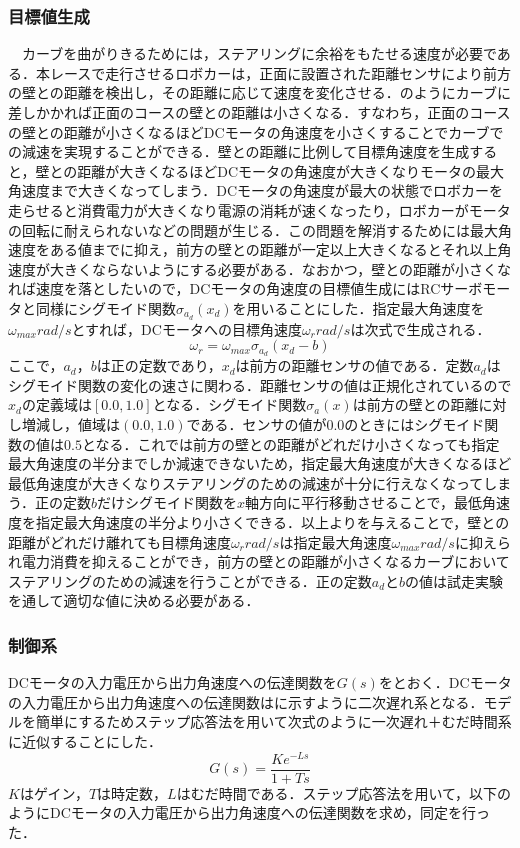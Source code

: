 \subsubsection{目標値生成}
　カーブを曲がりきるためには，ステアリングに余裕をもたせる速度が必要である．本レースで走行させるロボカーは，正面に設置された距離センサにより前方の壁との距離を検出し，その距離に応じて速度を変化させる．のようにカーブに差しかかれば正面のコースの壁との距離は小さくなる．すなわち，正面のコースの壁との距離が小さくなるほどDCモータの角速度を小さくすることでカーブでの減速を実現することができる．壁との距離に比例して目標角速度を生成すると，壁との距離が大きくなるほどDCモータの角速度が大きくなりモータの最大角速度まで大きくなってしまう．DCモータの角速度が最大の状態でロボカーを走らせると消費電力が大きくなり電源の消耗が速くなったり，ロボカーがモータの回転に耐えられないなどの問題が生じる．この問題を解消するためには最大角速度をある値までに抑え，前方の壁との距離が一定以上大きくなるとそれ以上角速度が大きくならないようにする必要がある．なおかつ，壁との距離が小さくなれば速度を落としたいので，DCモータの角速度の目標値生成にはRCサーボモータと同様にシグモイド関数$\sigma_{a_{d}}(x_{d})$を用いることにした．指定最大角速度を$\omega_{max}\unit{rad/s} $とすれば，DCモータへの目標角速度$\omega_{r}\unit{rad/s}$は次式で生成される．
\begin{equation}
 \omega_{r}=\omega_{max}\sigma_{a_{d}}(x_{d}-b)\label{eq::omega_r}
\end{equation}
ここで，$a_{d}$，$b$は正の定数であり，$x_{d}$は前方の距離センサの値である．定数$a_{d}$はシグモイド関数の変化の速さに関わる．距離センサの値は正規化されているので$x_{d}$の定義域は$[0.0,1.0]$となる．シグモイド関数$\sigma_{a}(x)$は前方の壁との距離に対し増減し，値域は$(0.0,1.0)$である．センサの値が$0.0$のときにはシグモイド関数の値は$0.5$となる．これでは前方の壁との距離がどれだけ小さくなっても指定最大角速度の半分までしか減速できないため，指定最大角速度が大きくなるほど最低角速度が大きくなりステアリングのための減速が十分に行えなくなってしまう．正の定数$b$だけシグモイド関数を$x$軸方向に平行移動させることで，最低角速度を指定最大角速度の半分より小さくできる．以上よりを与えることで，壁との距離がどれだけ離れても目標角速度$\omega_{r}\unit{rad/s}$は指定最大角速度$\omega_{max}\unit{rad/s}$に抑えられ電力消費を抑えることができ，前方の壁との距離が小さくなるカーブにおいてステアリングのための減速を行うことができる．正の定数$a_{d}$と$b$の値は試走実験を通して適切な値に決める必要がある．

 

\subsubsection{制御系}
  DCモータの入力電圧から出力角速度への伝達関数を$G(s)$をとおく．DCモータの入力電圧から出力角速度への伝達関数はに示すように二次遅れ系となる．モデルを簡単にするためステップ応答法を用いて次式のように一次遅れ＋むだ時間系に近似することにした．  
\begin{equation}
 G(s)=\frac{Ke^{-Ls}}{1+Ts}
\end{equation} 
$K$はゲイン，$T$は時定数，$L$はむだ時間である．ステップ応答法を用いて，以下のようにDCモータの入力電圧から出力角速度への伝達関数を求め，同定を行った．

